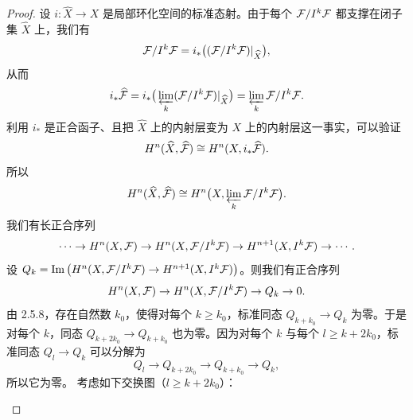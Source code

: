 \begin{proof}
设 $i\colon\widehat{X}\to X$ 是局部环化空间的标准态射。由于每个 $\mathcal{F}/I^k\mathcal{F}$ 都支撑在闭子集 $\widehat{X}$ 上，我们有
\begin{equation*}
\mathcal{F}/I^k\mathcal{F}=i_*\big((\mathcal{F}/I^k\mathcal{F})|_{\widehat{X}}\big),
\end{equation*}
从而
\begin{equation*}
i_*\widehat{\mathcal{F}}=i_*\big(\varprojlim_k(\mathcal{F}/I^k\mathcal{F})|_{\widehat{X}}\big)=\varprojlim_k\mathcal{F}/I^k\mathcal{F}.
\end{equation*}
利用 $i_*$ 是正合函子、且把 $\widehat{X}$ 上的内射层变为 $X$ 上的内射层这一事实，可以验证
\begin{equation*}
H^n(\widehat{X},\widehat{\mathcal{F}})\cong H^n(X,i_*\widehat{\mathcal{F}}).
\end{equation*}
所以
\begin{equation*}
H^n(\widehat{X},\widehat{\mathcal{F}})\cong H^n\big(X,\varprojlim_k\mathcal{F}/I^k\mathcal{F}\big).
\end{equation*}
我们有长正合序列
\begin{equation*}
\cdots\to H^n(X,\mathcal{F})\to H^n(X,\mathcal{F}/I^k\mathcal{F})\to H^{n+1}(X,I^k\mathcal{F})\to\cdots.
\end{equation*}
设 $Q_k=\operatorname{Im}\big(H^n(X,\mathcal{F}/I^k\mathcal{F})\to H^{n+1}(X,I^k\mathcal{F})\big)$。则我们有正合序列
\begin{equation*}
H^n(X,\mathcal{F})\to H^n(X,\mathcal{F}/I^k\mathcal{F})\to Q_k\to 0.
\end{equation*}
由 2.5.8，存在自然数 $k_0$，使得对每个 $k\ge k_0$，标准同态 $Q_{k+k_0}\to Q_k$ 为零。于是对每个 $k$，同态 $Q_{k+2k_0}\to Q_{k+k_0}$ 也为零。因为对每个 $k$ 与每个 $l\ge k+2k_0$，标准同态 $Q_l\to Q_k$ 可以分解为
\begin{equation*}
Q_l\to Q_{k+2k_0}\to Q_{k+k_0}\to Q_k,
\end{equation*}
所以它为零。
考虑如下交换图（$l\ge k+2k_0$）：

\begin{center}
\end{center}


\end{proof}
